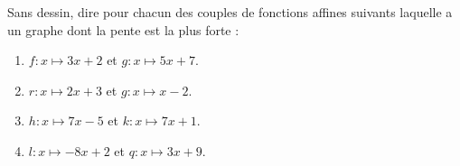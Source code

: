 
\begin{exercice}\label{exosmath-0490}

    Sans dessin, dire pour chacun des couples de fonctions affines suivants laquelle a un graphe dont la pente est la plus forte :
    \begin{enumerate}
        \item
            \( f\colon x\mapsto 3x+2\) et \( g\colon x\mapsto 5x+7\).
        \item
            \( r\colon x\mapsto 2x+3\) et \( g\colon x\mapsto x-2\).
        \item
            \( h\colon x\mapsto 7x-5\) et \( k\colon x\mapsto 7x+1\).
        \item
            \( l\colon x\mapsto -8x+2\) et \( q\colon x\mapsto 3x+9\).
    \end{enumerate}

\end{exercice}
